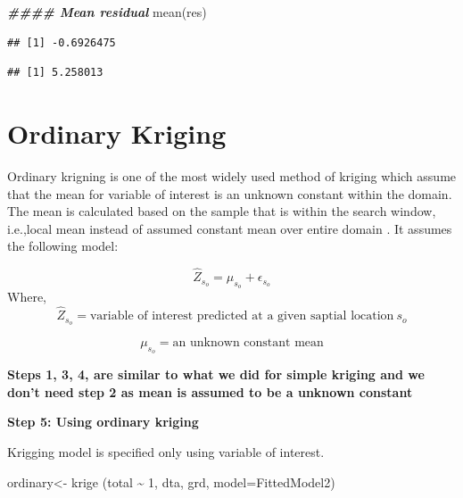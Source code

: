 \documentclass[
]{book}
\newenvironment{Shaded}{\begin{snugshade}}{\end{snugshade}}
\newcommand{\AttributeTok}[1]{\textcolor[rgb]{0.77,0.63,0.00}{#1}}
\newcommand{\DecValTok}[1]{\textcolor[rgb]{0.00,0.00,0.81}{#1}}
\newcommand{\DocumentationTok}[1]{\textcolor[rgb]{0.56,0.35,0.01}{\textbf{\textit{#1}}}}
\newcommand{\FunctionTok}[1]{\textcolor[rgb]{0.00,0.00,0.00}{#1}}
\newcommand{\NormalTok}[1]{#1}
\newcommand{\OtherTok}[1]{\textcolor[rgb]{0.56,0.35,0.01}{#1}}
\newcommand{\SpecialCharTok}[1]{\textcolor[rgb]{0.00,0.00,0.00}{#1}}
\begin{document}
\begin{Shaded}
\begin{Highlighting}[]
\DocumentationTok{\#\#\#\# Mean residual}
\FunctionTok{mean}\NormalTok{(res)}
\end{Highlighting}
\end{Shaded}

\begin{verbatim}
## [1] -0.6926475
\end{verbatim}

\begin{Shaded}
\end{Shaded}

\begin{verbatim}
## [1] 5.258013
\end{verbatim}

\hypertarget{ordinary-kriging}{%
\section{Ordinary Kriging}\label{ordinary-kriging}}

Ordinary krigning \citep{Matheron1973} is one of the most widely used method of kriging which assume that the mean for variable of interest is an unknown constant within the domain. The mean is calculated based on the sample that is within the search window, i.e.,local mean instead of assumed constant mean over entire domain \citep[\citet{Goovaerts2008}]{Clark2007}. It assumes the following model:

\[\hat{Z}_{s_o}=\mu_{s_o} + \epsilon_{s_o}\]
Where, \[\hat{Z}_{s_o}=\text{variable of interest predicted at a given saptial location}\ s_{o}\]

\[\mu_{s_o}=\text{an unknown constant mean}\]

\textbf{Steps 1, 3, 4, are similar to what we did for simple kriging and we don't need step 2 as mean is assumed to be a unknown constant}

\textbf{Step 5: Using ordinary kriging}

Krigging model is specified only using variable of interest.

\begin{Shaded}
\begin{Highlighting}[]
\NormalTok{ordinary}\OtherTok{\textless{}{-}} \FunctionTok{krige}\NormalTok{ (total }\SpecialCharTok{\textasciitilde{}} \DecValTok{1}\NormalTok{, dta, grd, }\AttributeTok{model=}\NormalTok{FittedModel2)}
\end{Highlighting}
\end{Shaded}
\end{document}
